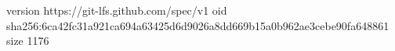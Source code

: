 version https://git-lfs.github.com/spec/v1
oid sha256:6ca42fc31a921ca694a63425d6d9026a8dd669b15a0b962ae3cebe90fa648861
size 1176
